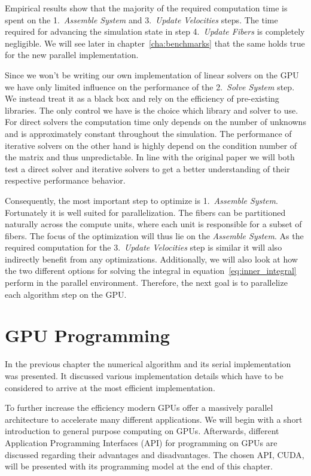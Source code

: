 \documentclass[a4paper,11pt]{kth-mag}
\begin{document}
Empirical results show that the majority of the required computation time is spent on the 1.~\emph{Assemble System} and 3.~\emph{Update Velocities} steps. The time required for advancing the simulation state in step 4.~\emph{Update Fibers} is completely negligible. We will see later in chapter~\ref{cha:benchmarks} that the same holds true for the new parallel implementation.

Since we won't be writing our own implementation of linear solvers on the GPU we have only limited influence on the performance of the 2.~\emph{Solve System} step. We instead treat it as a black box and rely on the efficiency of pre-existing libraries. The only control we have is the choice which library and solver to use. For direct solvers the computation time only depends on the number of unknowns and is approximately constant throughout the simulation. The performance of iterative solvers on the other hand is highly depend on the condition number of the matrix and thus unpredictable. In line with the original paper we will both test a direct solver and iterative solvers to get a better understanding of their respective performance behavior.

Consequently, the most important step to optimize is 1.~\emph{Assemble System}. Fortunately it is well suited for parallelization. The fibers can be partitioned naturally across the compute units, where each unit is responsible for a subset of fibers. The focus of the optimization will thus lie on the \emph{Assemble System}. As the required computation for the 3.~\emph{Update Velocities} step is similar it will also indirectly benefit from any optimizations. Additionally, we will also look at how the two different options for solving the integral in equation~\ref{eq:inner_integral} perform in the parallel environment. Therefore, the next goal is to parallelize each algorithm step on the GPU.

\chapter{GPU Programming}
\label{cha:gpu_programming}

In the previous chapter the numerical algorithm and its serial implementation was presented. It discussed various implementation details which have to be considered to arrive at the most efficient implementation.

To further increase the efficiency modern GPUs offer a massively parallel architecture to accelerate many different applications. We will begin with a short introduction to general purpose computing on GPUs. Afterwards, different Application Programming Interfaces (API) for programming on GPUs are discussed regarding their advantages and disadvantages. The chosen API, CUDA, will be presented with its programming model at the end of this chapter.
\end{document}
